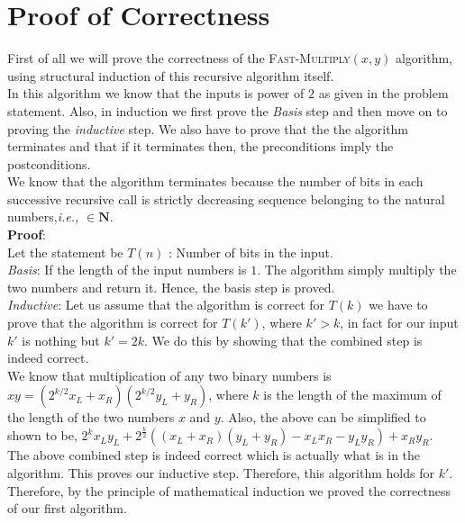 \documentclass[12pt,a4paper]{article}%
\begin{document}
	\section{Proof of Correctness}
	\begin{flushleft}
		First of all we will prove the correctness of the \textsc{Fast-Multiply}$(x,y)$ algorithm, using structural induction of this recursive algorithm itself.\\\smallskip
		In this algorithm we know that the inputs is power of $2$ as given in the problem statement. Also, in induction we first prove the \textit{Basis} step and then move on to proving the \textit{inductive} step. We also have to prove that the the algorithm terminates and that if it terminates then, the preconditions imply the postconditions. \\\smallskip
		We know that the algorithm terminates because the number of bits in each successive recursive call is strictly decreasing sequence belonging to the natural numbers,\textit{i.e.,} $\in \mathbf{N} $.
		\\\smallskip
		\textbf{Proof}:
		\\\smallskip
		Let the statement be $T(n)$ : Number of bits in the input.\\\bigskip
		\textit{Basis}: If the length of the input numbers is $1$. The algorithm simply multiply the two numbers and return it. Hence, the basis step is proved.\\\bigskip
		\textit{Inductive}: Let us assume that the algorithm is correct for $T(k)$ we have to prove that the algorithm is correct for $T(k')$, where $k'>k$, in fact for our input $k'$ is nothing but $k'=2k$. We do this by showing that the combined step is indeed correct.\\\smallskip
		We know that multiplication of any two binary numbers is $xy=(2^{k/2} x_L +x_R)(2^{k/2} y_L +y_R)$, where $k$ is the length of the maximum of the length of the two numbers $x$ and $y$. Also, the above can be simplified to shown to be,
		$2^{k} x_L y_L + 2^{\frac{k}{2}} ((x_L +x_R)(y_L +y_R) - x_L x_R - y_L y_R ) + x_R y_R $.\\\smallskip
		The above combined step is indeed correct which is actually what is in the algorithm. This proves our inductive step. Therefore, this algorithm holds for $k'$.\\\smallskip
		Therefore, by the principle of mathematical induction we proved the correctness of our first algorithm.\\\bigskip
		

\end{flushleft}
\end{document}
